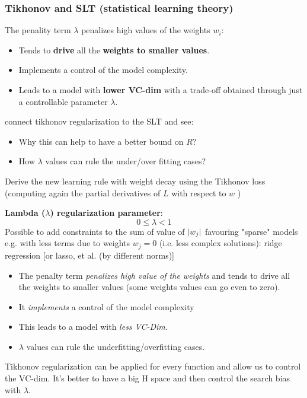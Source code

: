\documentclass[../main.tex]{subfiles}
\begin{document}
\subsubsection*{Tikhonov and SLT (statistical learning theory)}%
The penality term $\lambda$ penalizes high values of the weights $w_i$:
\begin{itemize}
    \item Tends to \textbf{drive} all the \textbf{weights to smaller values}.
    \item Implements a control of the model complexity.
    \item Leads to a model with \textbf{lower VC-dim} with a trade-off obtained through just a controllable parameter $\lambda$.
\end{itemize}

\begin{exercise}
    connect tikhonov regularization to the SLT and see:
    \begin{itemize}
        \item Why this can help to have a better bound on $R$?
	\item How $\lambda$ values can rule the under/over fitting cases?
    \end{itemize}
\end{exercise}
\begin{exercise}
    Derive the new learning rule with weight decay using the Tikhonov loss (computing again the partial derivatives of $L$  with respect to $w$ )
\end{exercise}

\textbf{Lambda ($\lambda$) regularization parameter}: 
$$ 0\leq \lambda < 1$$
Possible to add constraints to the sum of value of $\lvert w_j\rvert$ favouring "sparse" models e.g. with less terms due to weights $w_j=0$ (i.e. less complex solutions): ridge regression [or lasso, et al. (by different norms)]

\begin{itemize}
    \item The penalty term \emph{penalizes high value of the weights} and tends to drive all the weights to smaller values (some weights values can go even to zero).
    \item It \emph{implements} a control of the model complexity
    \item This leads to a model with \emph{less VC-Dim}.
    \item $\lambda$ values can rule the underfitting/overfitting cases.
\end{itemize}
Tikhonov regularization can be applied for every function and allow us to control the VC-dim. It's better to have a big H space and then control the search bias with $\lambda$.
\end{document}
